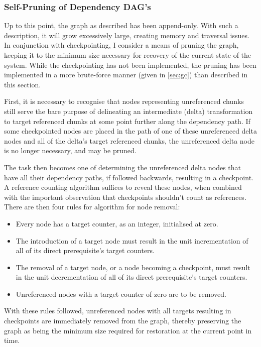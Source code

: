 \subsubsection{Self-Pruning of Dependency DAG's}

Up to this point, the graph as described has been append-only.
With such a description, it will grow excessively large, creating memory and traversal issues.
In conjunction with checkpointing, I consider a means of pruning the graph, keeping it to the minimum size necessary for recovery of the current state of the system.
While the checkpointing has not been implemented, the pruning has been implemented in a more brute-force manner (given in \cref{sec:gc}) than described in this section.

First, it is necessary to recognise that nodes representing unreferenced chunks still serve the bare purpose of delineating an intermediate (delta) transformation to target referenced chunks at some point further along the dependency path\cite{mogul2002deltahttp}.
If some checkpointed nodes are placed in the path of one of these unreferenced delta nodes and all of the delta's target referenced chunks, the unreferenced delta node is no longer necessary, and may be pruned.

The task then becomes one of determining the unreferenced delta nodes that have all their dependency paths, if followed backwards, resulting in a checkpoint.
A reference counting algorithm suffices to reveal these nodes, when combined with the important observation that checkpoints shouldn't count as references.
There are then four rules for algorithm for node removal: \begin{itemize} \item Every node has a target counter, as an integer, initialised at zero.
	\item The introduction of a target node must result in the unit incrementation of all of its direct prerequisite's target counters.
	\item The removal of a target node, or a node becoming a checkpoint, must result in the unit decrementation of all of its direct prerequisite's target counters.
	\item Unreferenced nodes with a target counter of zero are to be removed.
\end{itemize}
With these rules followed, unreferenced nodes with all targets resulting in checkpoints are immediately removed from the graph, thereby preserving the graph as being the minimum size required for restoration at the current point in time.

